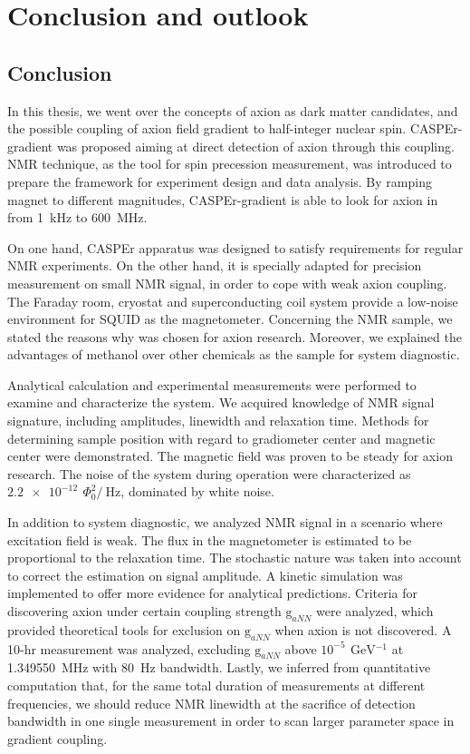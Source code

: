 \chapter{Conclusion and outlook}

\section{Conclusion}

In this thesis, we went over the concepts of axion as dark matter candidates, and the possible coupling of axion field gradient to half-integer nuclear spin. 
CASPEr-gradient was proposed aiming at direct detection of axion through this coupling. 
NMR technique, as the tool for spin precession measurement, was introduced to prepare the framework for experiment design and data analysis. By ramping magnet to different magnitudes, CASPEr-gradient is able to look for axion in from \SI{1}{\kHz} to \SI{600}{\MHz}. 

On one hand, CASPEr apparatus was designed to satisfy requirements for regular NMR experiments. On the other hand, it is specially adapted for precision measurement on small NMR signal, in order to cope with weak axion coupling. The Faraday room, cryostat and superconducting coil system provide a low-noise environment for SQUID as the magnetometer. %
Concerning the NMR sample, we stated the reasons why  was chosen for axion research. Moreover, we explained the advantages of methanol over other chemicals as the sample for system diagnostic. 

Analytical calculation and experimental measurements were performed to examine and characterize the system. We acquired knowledge of NMR signal signature, including amplitudes, linewidth and relaxation time. Methods for determining sample position with regard to gradiometer center and magnetic center were demonstrated. The magnetic field was proven to be steady for axion research. The noise of the system during operation were characterized as $\SI{2.2e-12}{}\,\Phi_0^{2}/\SI{}{\Hz}$, dominated by white noise. 

In addition to system diagnostic, we analyzed NMR signal in a scenario where excitation field is weak. The flux in the magnetometer is estimated to be proportional to the relaxation time. The stochastic nature was taken into account to correct the estimation on signal amplitude. 
A kinetic simulation was implemented to offer more evidence for analytical predictions. 
Criteria for discovering axion under certain coupling strength $\mathrm{g}_{aNN}$ were analyzed, which provided theoretical tools for exclusion on $\mathrm{g}_{aNN}$ when axion is not discovered. A 10-hr measurement was analyzed, excluding $\mathrm{g}_{aNN}$ above $10^{-5}\,\SI{}{\GeV^{-1}}$ at \SI{1.349550}{\MHz} with \SI{80}{\Hz} bandwidth. Lastly, we inferred from quantitative computation that, for the same total duration of measurements at different frequencies, we should reduce NMR linewidth at the sacrifice of detection bandwidth in one single measurement in order to scan larger parameter space in gradient coupling. 

